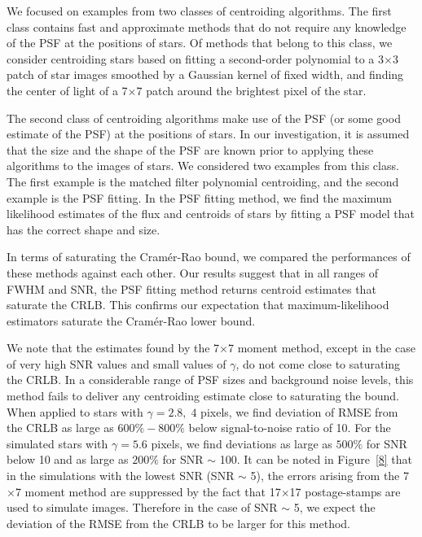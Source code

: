 We focused on examples from two classes of centroiding algorithms. The first class contains fast and approximate
methods that do not require any knowledge of the PSF at the positions of stars. Of methods that belong to this class,
we consider centroiding stars based on fitting a second-order
polynomial to a 3$\times$3 patch of star images smoothed by a Gaussian kernel of fixed width, and finding the center of light 
of a 7$\times$7 patch around the brightest pixel of the star.

The second class of centroiding algorithms make use of the PSF (or some good estimate of the PSF)
at the positions of stars. In our investigation, it is assumed that the size and the shape of the PSF are known prior to applying these algorithms to the images of stars. We considered two examples from this class. The first example is the matched filter polynomial centroiding, and the
second example is the PSF fitting. In the PSF fitting method, we find the maximum likelihood estimates of the flux and centroids of stars by fitting a PSF model that has the correct shape and size.  


In terms of saturating the Cram\'{e}r-Rao bound, we compared the performances of these methods against each other. Our results suggest that in all ranges of FWHM and SNR, the PSF fitting method returns 
centroid estimates that saturate the CRLB. This confirms our expectation that maximum-likelihood estimators saturate the Cram\'{e}r-Rao lower bound. 

We note that the estimates found by the 7$\times$7 moment method, except in the case of
very high SNR values and small values of $\gamma$, do not come close to
saturating the CRLB. In a considerable range of PSF sizes and background noise levels, 
this method fails to deliver any centroiding estimate close to saturating the bound. When applied to stars with $\gamma = 2.8, \; 4$ pixels, we find deviation of RMSE from the CRLB as large as $600\%-800\%$ below signal-to-noise ratio of 10. For the simulated stars with $\gamma = 5.6$ pixels, we find deviations as large as $500 \%$ for SNR below 10 and as large as $200 \%$ for SNR $\sim$ 100. It can be noted in Figure~\ref{8} that in the simulations with the lowest SNR (SNR $\sim$ 5), the errors arising from the 7$\times$7 moment method are suppressed by the fact that 17$\times$17 postage-stamps are used to simulate images. Therefore in the case of SNR $\sim$ 5, we expect the deviation of the RMSE from the CRLB to be larger for this method.

